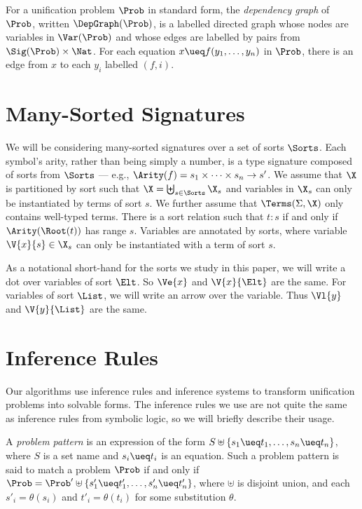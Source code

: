 For a unification problem $\Prob$ in standard form, the \emph{dependency graph}
of $\Prob$, written $\DepGraph(\Prob)$, is a labelled directed graph whose
nodes are variables in $\Var(\Prob)$ and whose edges are labelled by pairs from
$\Sig(\Prob) \times \Nat$.  For each equation $x \ueq f(y_1, \dotsc, y_n)$ in
$\Prob$, there is an edge from $x$ to each $y_i$ labelled $(f, i)$.

\section{Many-Sorted Signatures}\label{sec:sorts}

We will be considering many-sorted signatures over a set of sorts $\Sorts$.
Each symbol's arity, rather than being simply a number, is a type signature
composed of sorts from $\Sorts$ --- e.g., $\Arity(f) = s_1 \times \dotsb \times
s_n \to s'$. We assume that $\X$ is partitioned by sort such that $\X =
\biguplus_{s \in \Sorts} \X_{s}$ and variables in $\X_{s}$ can only be
instantiated by terms of sort $s$. We further assume that $\Terms(\Sigma, \X)$
only contains well-typed terms. There is a sort relation such that $t : s$ if
and only if $\Arity(\Root(t))$ has range $s$. Variables are annotated by sorts,
where variable $\V{x}{s} \in \X_s$ can only be instantiated with a term of sort
$s$.

As a notational short-hand for the sorts we study in this paper, we will write
a dot over variables of sort $\Elt$. So $\Ve{x}$ and $\V{x}{\Elt}$ are the
same. For variables of sort $\List$, we will write an arrow over the variable.
Thus $\Vl{y}$ and $\V{y}{\List}$ are the same.

\section{Inference Rules}\label{sec:inf-rules}

Our algorithms use inference rules and inference systems to transform
unification problems into solvable forms. The inference rules we use are
not quite the same as inference rules from symbolic logic, so we will briefly
describe their usage.

A \emph{problem pattern} is an expression of the form $S \uplus \{ s_1 \ueq
t_1, \dotsc, s_n \ueq t_n \}$, where $S$ is a set name and $s_i \ueq t_i$ is an
equation. Such a problem pattern is said to match a problem $\Prob$ if and only
if $\Prob = \Prob' \uplus \{ s'_1 \ueq t'_1, \dotsc, s'_n \ueq t'_n \}$, where
$\uplus$ is disjoint union, and each $s'_i = \theta(s_i)$ and $t'_i =
\theta(t_i)$ for some substitution $\theta$.

